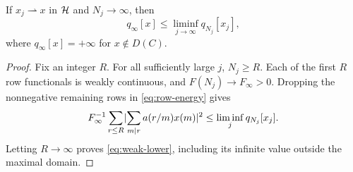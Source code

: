 \begin{lemma}
\label{lem:weak-lower}
If $x_j\rightharpoonup x$ in $\mathcal{H}$ and $N_j\to\infty$, then
\begin{equation}
 q_\infty[x]\le\liminf_{j\to\infty}q_{N_j}[x_j],
 \label{eq:weak-lower}
\end{equation}
where $q_\infty[x]=+\infty$ for $x\notin D(C)$.
\end{lemma}
\begin{proof}
Fix an integer $R$. For all sufficiently large $j$, $N_j\ge R$.
Each of the first $R$ row functionals is weakly continuous, and
$F(N_j)\to F_\infty>0$. Dropping the nonnegative remaining rows in
\eqref{eq:row-energy} gives
\[
 F_\infty^{-1}\sum_{r\le R}
 \lvert \sum_{m\mid r}a(r/m)x(m)\rvert^2
 \le\liminf_j q_{N_j}[x_j].
\]
Letting $R\to\infty$ proves \eqref{eq:weak-lower}, including its
infinite value outside the maximal domain.
\end{proof}

